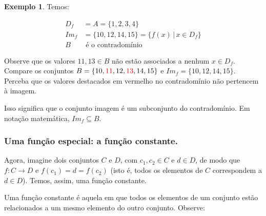 \documentclass[12pt,openright,twoside,a4paper]{article}
\theoremstyle{definition}
\newtheorem{example}{Exemplo}[section]
\begin{document}
\begin{example}
		Temos:
		
		\begin{align*}
			D_f &= A = \{1,2,3,4\}\\
			Im_f &= \{10, 12, 14, 15\} = \{f(x) \,|\, x \in D_f\} \\
			B &\text{ é o contradomínio}			
		\end{align*}
		
		Observe que os valores $11, 13 \in B$ não estão associados a nenhum $x \in D_f$. Compare os conjuntos $B = \{10, \textcolor{red}{11}, 12, \textcolor{red}{13}, 14, 15\}$ e $Im_f = \{10, 12, 14, 15\}$. Perceba que os valores destacados em vermelho no contradomínio não pertencem à imagem.
		
		Isso significa que o conjunto imagem é um subconjunto do contradomínio. Em notação matemática, $Im_f \subseteq B$. 
	\end{example}
	
	\subsubsection{Uma função especial: a função constante.}
	
	Agora, imagine dois conjuntos $C$ e $D$, com $c_1, c_2 \in C$ e $d \in D$, de modo que $f: C \longrightarrow D$ e $f(c_1) = d = f(c_2)$ (isto é, todos os elementos de $C$ correspondem a $d \in D$). Temos, assim, uma função constante.
	
	Uma função constante é aquela em que todos os elementos de um conjunto estão relacionados a um mesmo elemento do outro conjunto. Observe:
	
\end{document}
